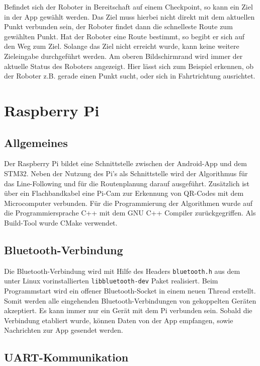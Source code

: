 \documentclass[12pt, a4paper]{report}
\begin{document}
Befindet sich der Roboter in Bereitschaft auf einem Checkpoint, so kann ein Ziel in der App gewählt werden. Das Ziel muss hierbei nicht direkt mit dem aktuellen Punkt verbunden sein, der Roboter findet dann die schnelleste Route zum gewählten Punkt. Hat der Roboter eine Route bestimmt, so begibt er sich auf den Weg zum Ziel. Solange das Ziel nicht erreicht wurde, kann keine weitere Zieleingabe durchgeführt werden. Am oberen Bildschirmrand wird immer der aktuelle Status des Roboters angezeigt. Hier lässt sich zum Beispiel erkennen, ob der Roboter z.B. gerade einen Punkt sucht, oder sich in Fahrtrichtung ausrichtet.


\newpage
\section{Raspberry Pi}

\subsection{Allgemeines}

Der Raspberry Pi bildet eine Schnittstelle zwischen der Android-App und dem STM32.
Neben der Nutzung des Pi's als Schnittstelle wird der Algorithmus für das Line-Following und für die Routenplanung darauf ausgeführt. Zusätzlich ist über ein Flachbandkabel eine Pi-Cam zur Erkennung von QR-Codes mit dem Microcomputer verbunden. Für die Programmierung der Algorithmen wurde auf die Programmiersprache C++ mit dem GNU C++ Compiler zurückgegriffen. Als Build-Tool wurde CMake verwendet.

\subsection{Bluetooth-Verbindung}

Die Bluetooth-Verbindung wird mit Hilfe des Headers \texttt{bluetooth.h} aus dem unter Linux vorinstallierten \texttt{libbluetooth-dev} Paket realisiert. Beim Programmstart wird ein offener Bluetooth-Socket in einem neuen Thread erstellt. Somit werden alle eingehenden Bluetooth-Verbindungen von gekoppelten Geräten akzeptiert. Es kann immer nur ein Gerät mit dem Pi verbunden sein. Sobald die Verbindung etabliert wurde, können Daten von der App empfangen, sowie Nachrichten zur App gesendet werden.

\subsection{UART-Kommunikation}
\end{document}
